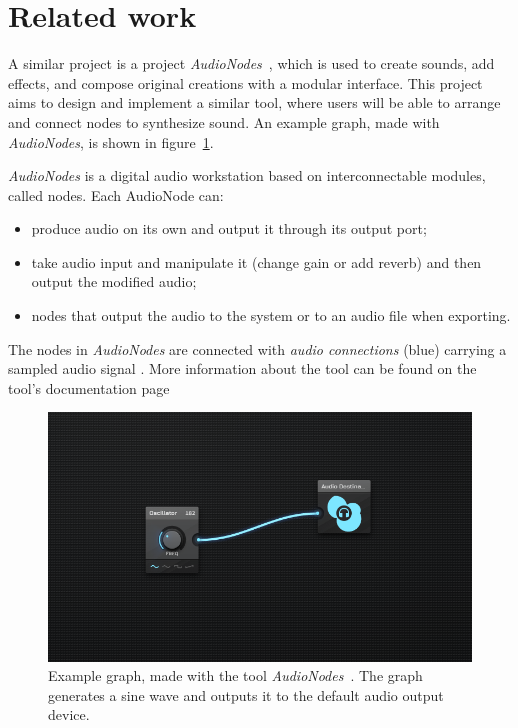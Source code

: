 \documentclass[conference]{IEEEtran}
\begin{document}
\section{Related work}
A similar project is a project \textit{AudioNodes}~\cite{audionodes}, which is used to create sounds, add effects, and compose original creations with a modular interface. This project aims to design and implement a similar tool, where users will be able to arrange and connect nodes to synthesize sound. An example graph, made with \textit{AudioNodes}, is shown in figure~\ref{fig:audionodes}.

\textit{AudioNodes} is a digital audio workstation based on interconnectable modules, called nodes. Each AudioNode can:
\begin{itemize}
    \item produce audio on its own and output it through its output port;
    \item take audio input and manipulate it (change gain or add reverb) and then output the modified audio;
    \item nodes that output the audio to the system or to an audio file when exporting.
\end{itemize}
The nodes in \textit{AudioNodes} are connected with \textit{audio connections} (blue) carrying a sampled audio signal \cite{audionodes}. More information about the tool can be found on the tool's documentation page~\cite{audionodesdocs}

\begin{figure}[H]
\centering
\includegraphics[width=1.0\linewidth]{graphics/audionodes.png}
\caption{Example graph, made with the tool \textit{AudioNodes}~\cite{audionodes}. The graph generates a sine wave and outputs it to the default audio output device.}
\label{fig:audionodes}
\end{figure}
\end{document}
